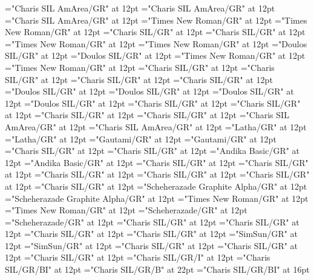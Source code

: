 \documentclass[a4paper,twoside]{article}
\begin{document}
\font\spanmxbfonipa="Charis SIL AmArea/GR" at 12pt
\font\divmxb="Charis SIL AmArea/GR" at 12pt
\font\spanmxb="Charis SIL AmArea/GR" at 12pt
\font\divmy="Times New Roman/GR" at 12pt
\font\spanmy="Times New Roman/GR" at 12pt
\font\divne="Charis SIL/GR" at 12pt
\font\spanne="Charis SIL/GR" at 12pt
\font\divpt="Times New Roman/GR" at 12pt
\font\spanpt="Times New Roman/GR" at 12pt
\font\divqaafonipaxyii="Doulos SIL/GR" at 12pt
\font\spanqaafonipaxyii="Doulos SIL/GR" at 12pt
\font\divqaaxlel="Times New Roman/GR" at 12pt
\font\spanqaaxlel="Times New Roman/GR" at 12pt
\font\divro="Charis SIL/GR" at 12pt
\font\spanro="Charis SIL/GR" at 12pt
\font\divru="Charis SIL/GR" at 12pt
\font\spanru="Charis SIL/GR" at 12pt
\font\divsehfonipaxetic="Doulos SIL/GR" at 12pt
\font\spansehfonipaxetic="Doulos SIL/GR" at 12pt
\font\divsehfonipa="Doulos SIL/GR" at 12pt
\font\spansehfonipa="Doulos SIL/GR" at 12pt
\font\divsehZxxxxaudio="Charis SIL/GR" at 12pt
\font\spansehZxxxxaudio="Charis SIL/GR" at 12pt
\font\divseh="Charis SIL/GR" at 12pt
\font\spanseh="Charis SIL/GR" at 12pt
\font\divstp="Charis SIL AmArea/GR" at 12pt
\font\spanstp="Charis SIL AmArea/GR" at 12pt
\font\divta="Latha/GR" at 12pt
\font\spanta="Latha/GR" at 12pt
\font\divte="Gautami/GR" at 12pt
\font\spante="Gautami/GR" at 12pt
\font\divth="Charis SIL/GR" at 12pt
\font\spanth="Charis SIL/GR" at 12pt
\font\divtpi="Andika Basic/GR" at 12pt
\font\spantpi="Andika Basic/GR" at 12pt
\font\divtrfonipaxemic="Charis SIL/GR" at 12pt
\font\spantrfonipaxemic="Charis SIL/GR" at 12pt
\font\divtrfonipa="Charis SIL/GR" at 12pt
\font\spantrfonipa="Charis SIL/GR" at 12pt
\font\divtr="Charis SIL/GR" at 12pt
\font\spantr="Charis SIL/GR" at 12pt
\font\divurArab="Scheherazade Graphite Alpha/GR" at 12pt
\font\spanurArab="Scheherazade Graphite Alpha/GR" at 12pt
\font\divurxind="Times New Roman/GR" at 12pt
\font\spanurxind="Times New Roman/GR" at 12pt
\font\divur="Scheherazade/GR" at 12pt
\font\spanur="Scheherazade/GR" at 12pt
\font\divvi="Charis SIL/GR" at 12pt
\font\spanvi="Charis SIL/GR" at 12pt
\font\divzhCNpinyin="Charis SIL/GR" at 12pt
\font\spanzhCNpinyin="Charis SIL/GR" at 12pt
\font\divzhCN="SimSun/GR" at 12pt
\font\spanzhCN="SimSun/GR" at 12pt
\font\picturepictureRight="Charis SIL/GR" at 12pt
\font\imgpicturedivpictureLeft="Charis SIL/GR" at 12pt
\font\scrBookscrBody="Charis SIL/GR" at 12pt
\font\scrBookNamezxxscrBookscrBody="Charis SIL/GR/I" at 12pt
\font\scrBookCodezxxscrBookscrBody="Charis SIL/GR/BI" at 12pt
\font\TitleMainscrBookscrBody="Charis SIL/GR/B" at 22pt
\font\TitleSecondaryzxxTitleMainscrBookscrBody="Charis SIL/GR/BI" at 16pt
\end{document}
